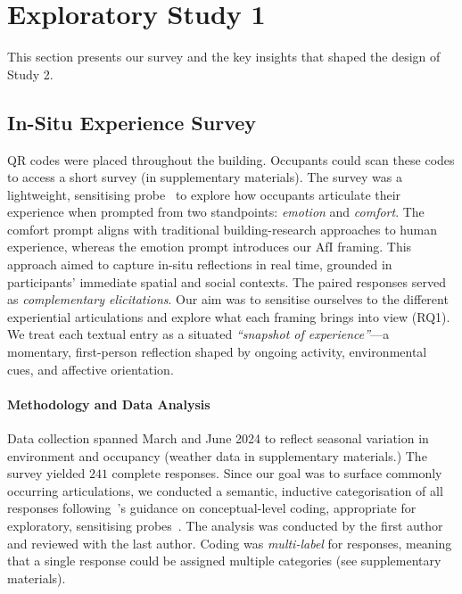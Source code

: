 \section{Exploratory Study 1}
\label{sec:ch3-s1}
This section presents our survey and the key insights that shaped the design of Study 2.

\subsection{In-Situ Experience Survey}
QR codes were placed throughout the building. Occupants could scan these codes to access a short survey (in supplementary materials). The survey was a lightweight, sensitising  probe~\cite{slovak2017reflective} to explore how occupants articulate their experience when prompted from two standpoints: \textit{emotion} and \textit{comfort}. The comfort prompt aligns with traditional building-research approaches to human experience, whereas the emotion prompt introduces our AfI framing. This approach aimed to capture in-situ reflections in real time, grounded in participants’ immediate spatial and social contexts. The paired responses served as \textit{complementary elicitations}. Our aim was to sensitise ourselves to the different experiential articulations and  explore what each framing brings into view (RQ1). We treat each textual entry as a situated \textit{``snapshot of experience''}---a momentary, first-person reflection shaped by ongoing activity, environmental cues, and affective orientation. 

\paragraph{Methodology and Data Analysis}
Data collection spanned March and June 2024 to reflect seasonal variation in environment and occupancy (weather data in supplementary materials.) The survey yielded $241$ complete responses. Since our goal was to surface commonly occurring articulations, we conducted a semantic, inductive categorisation of all responses following~\citet{braun2022conceptual}'s guidance on conceptual-level coding, appropriate for exploratory, sensitising probes~\cite{braun2022conceptual, braun2023thematic}. The analysis was conducted by the first author and reviewed with the last author. Coding was \textit{multi-label} for responses, meaning that a single response could be assigned multiple categories (see supplementary materials).

